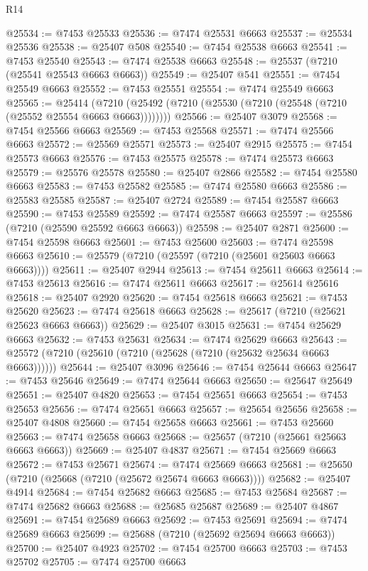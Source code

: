 \begin{lexlean}{R14}
\begin{coremodule}
{{{{{{{{{{{{{{{{{{{{{{{{{{{{{{{{{{{{{{{{{{{{{{{{{{{{{{{{{{{{{{{{{{{{{{{{{{{{{{{{{{@25534 := @7453 @25533
@25536 := @7474 @25531 @6663
@25537 := @25534 @25536
@25538 := @25407 @508
@25540 := @7454 @25538 @6663
@25541 := @7453 @25540
@25543 := @7474 @25538 @6663
@25548 := @25537 (@7210 (@25541 @25543 @6663 @6663))
@25549 := @25407 @541
@25551 := @7454 @25549 @6663
@25552 := @7453 @25551
@25554 := @7474 @25549 @6663
@25565 := @25414
    (@7210 (@25492 (@7210 (@25530 (@7210 (@25548 (@7210 (@25552 @25554 @6663 @6663))))))))
@25566 := @25407 @3079
@25568 := @7454 @25566 @6663
@25569 := @7453 @25568
@25571 := @7474 @25566 @6663
@25572 := @25569 @25571
@25573 := @25407 @2915
@25575 := @7454 @25573 @6663
@25576 := @7453 @25575
@25578 := @7474 @25573 @6663
@25579 := @25576 @25578
@25580 := @25407 @2866
@25582 := @7454 @25580 @6663
@25583 := @7453 @25582
@25585 := @7474 @25580 @6663
@25586 := @25583 @25585
@25587 := @25407 @2724
@25589 := @7454 @25587 @6663
@25590 := @7453 @25589
@25592 := @7474 @25587 @6663
@25597 := @25586 (@7210 (@25590 @25592 @6663 @6663))
@25598 := @25407 @2871
@25600 := @7454 @25598 @6663
@25601 := @7453 @25600
@25603 := @7474 @25598 @6663
@25610 := @25579 (@7210 (@25597 (@7210 (@25601 @25603 @6663 @6663))))
@25611 := @25407 @2944
@25613 := @7454 @25611 @6663
@25614 := @7453 @25613
@25616 := @7474 @25611 @6663
@25617 := @25614 @25616
@25618 := @25407 @2920
@25620 := @7454 @25618 @6663
@25621 := @7453 @25620
@25623 := @7474 @25618 @6663
@25628 := @25617 (@7210 (@25621 @25623 @6663 @6663))
@25629 := @25407 @3015
@25631 := @7454 @25629 @6663
@25632 := @7453 @25631
@25634 := @7474 @25629 @6663
@25643 := @25572 (@7210 (@25610 (@7210 (@25628 (@7210 (@25632 @25634 @6663 @6663))))))
@25644 := @25407 @3096
@25646 := @7454 @25644 @6663
@25647 := @7453 @25646
@25649 := @7474 @25644 @6663
@25650 := @25647 @25649
@25651 := @25407 @4820
@25653 := @7454 @25651 @6663
@25654 := @7453 @25653
@25656 := @7474 @25651 @6663
@25657 := @25654 @25656
@25658 := @25407 @4808
@25660 := @7454 @25658 @6663
@25661 := @7453 @25660
@25663 := @7474 @25658 @6663
@25668 := @25657 (@7210 (@25661 @25663 @6663 @6663))
@25669 := @25407 @4837
@25671 := @7454 @25669 @6663
@25672 := @7453 @25671
@25674 := @7474 @25669 @6663
@25681 := @25650 (@7210 (@25668 (@7210 (@25672 @25674 @6663 @6663))))
@25682 := @25407 @4914
@25684 := @7454 @25682 @6663
@25685 := @7453 @25684
@25687 := @7474 @25682 @6663
@25688 := @25685 @25687
@25689 := @25407 @4867
@25691 := @7454 @25689 @6663
@25692 := @7453 @25691
@25694 := @7474 @25689 @6663
@25699 := @25688 (@7210 (@25692 @25694 @6663 @6663))
@25700 := @25407 @4923
@25702 := @7454 @25700 @6663
@25703 := @7453 @25702
@25705 := @7474 @25700 @6663
}}}}}}}}}}}}}}}}}}}}}}}}}}}}}}}}}}}}}}}}}}}}}}}}}}}}}}}}}}}}}}}}}}}}}}}}}}}}}}}}}}
\end{coremodule}
\end{lexlean}
